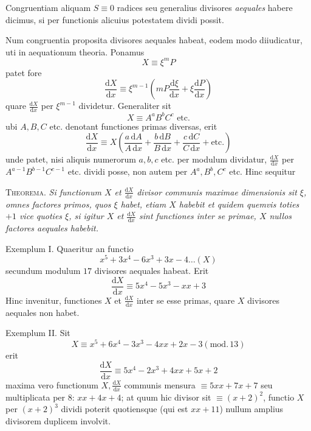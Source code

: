 Congruentiam aliquam $S\equiv0$ radices seu generalius divisores \emph{aequales} habere dicimus, si per functionis alicuius potestatem dividi possit.

Num congruentia proposita divisores aequales habeat, eodem modo diiudicatur, uti in aequationum theoria. Ponamus
\[
X\equiv\xi^mP
\]
patet fore
\[
\frac{\mathrm{d}X}{\mathrm{d}x}\equiv\xi^{m-1}\left(mP\frac{\mathrm{d}\xi}{\mathrm{d}x}+\xi\frac{\mathrm{d}P}{\mathrm{d}x}\right)
\]
quare $\frac{\mathrm{d}X}{\mathrm{d}x}$ per $\xi^{m-1}$ dividetur. Generaliter sit
\[
X\equiv A^aB^bC^c\text{ etc.}
\]
ubi $A,B,C$ etc. denotant functiones primas diversas, erit
\[
\frac{\mathrm{d}X}{\mathrm{d}x}\equiv X\left(\frac{a\,\mathrm{d}A}{A\,\mathrm{d}x}+\frac{b\,\mathrm{d}B}{B\,\mathrm{d}x}+\frac{c\,\mathrm{d}C}{C\,\mathrm{d}x}+\text{etc.}\right)
\]
unde patet, nisi aliquis numerorum $a,b,c$ etc. per modulum dividatur, $\frac{\mathrm{d}X}{\mathrm{d}x}$ per $A^{a-1}B^{b-1}C^{c-1}$ etc. dividi posse, non autem per $A^a,B^b,C^c$ etc. Hinc sequitur

\textsc{Theorema.} \emph{Si functionum $X$ et $\frac{\mathrm{d}X}{\mathrm{d}x}$ divisor communis maximae dimensionis sit $\xi$, omnes factores primos, quos $\xi$ habet, etiam $X$ habebit et quidem quemvis toties $+1$ vice quoties $\xi$, si igitur $X$ et $\frac{\mathrm{d}X}{\mathrm{d}x}$ sint functiones inter se primae, $X$ nullos factores aequales habebit.}

Exemplum I. Quaeritur an functio
\[
x^5+3x^4-6x^3+3x-4\ldots(X)
\]
secundum modulum $17$ divisores aequales habeat. Erit
\[
\frac{\mathrm{d}X}{\mathrm{d}x}\equiv5x^4-5x^3-xx+3
\]
Hinc invenitur, functiones $X$ et $\frac{\mathrm{d}X}{\mathrm{d}x}$ inter se esse primas, quare $X$ divisores aequales non habet.

Exemplum II. Sit
\[
X\equiv x^5+6x^4-3x^3-4xx+2x-3(\mathrm{mod.}\,13)
\]
erit
\[
\frac{\mathrm{d}X}{\mathrm{d}x}\equiv5x^4-2x^3+4xx+5x+2
\]
maxima vero functionum $X,\frac{\mathrm{d}X}{\mathrm{d}x}$ communis mensura $\equiv5xx+7x+7$ seu 
multiplicata per $8$: $xx+4x+4$; at quum hic divisor sit $\equiv(x+2)^2$, functio $X$ per $(x+2)^3$ dividi poterit quotiensque (qui est $xx+11$) nullum amplius divisorem duplicem involvit.

